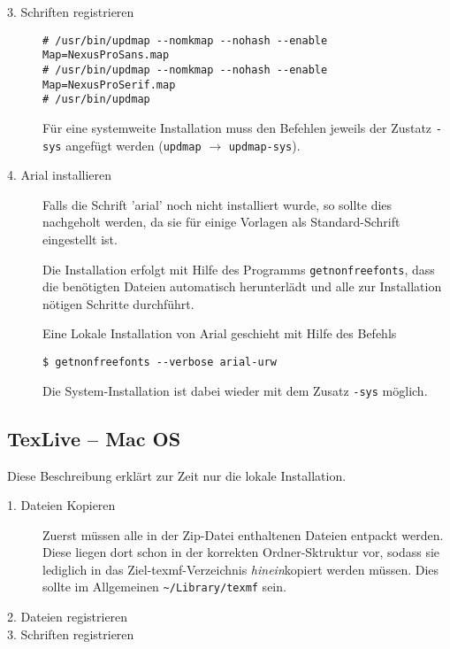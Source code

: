 \begin{description}
  \item[3. Schriften registrieren]\hfill

    \begin{lstlisting}
# /usr/bin/updmap --nomkmap --nohash --enable Map=NexusProSans.map
# /usr/bin/updmap --nomkmap --nohash --enable Map=NexusProSerif.map
# /usr/bin/updmap
    \end{lstlisting}
    
    Für eine systemweite Installation muss den Befehlen jeweils der Zustatz
    \texttt{-sys} angefügt werden (\lstinline{updmap} $\to$ \lstinline{updmap-sys}).
  
  \item[4. Arial installieren]\hfill
    Falls die Schrift 'arial' noch nicht installiert wurde, so sollte dies
    nachgeholt werden, da sie für einige Vorlagen als Standard-Schrift
    eingestellt ist.
    
    Die Installation erfolgt mit Hilfe des Programms \lstinline{getnonfreefonts},
    dass die benötigten Dateien automatisch herunterlädt und alle zur Installation
    nötigen Schritte durchführt.
    
    Eine Lokale Installation von Arial geschieht mit Hilfe des Befehls
    \begin{lstlisting}
$ getnonfreefonts --verbose arial-urw
    \end{lstlisting}
    
    Die System-Installation ist dabei wieder mit dem Zusatz \lstinline{-sys}
    möglich.



\end{description}


\newenvironment{knownissue}[1]{%
  \paragraph{#1}\hfill
  \newcommand{\solution}[1]{\noindent{\itshape ##1}}
}{%
}

\subsection{TexLive -- Mac OS}

Diese Beschreibung erklärt zur Zeit nur die lokale Installation.

\begin{description}
  \item[1. Dateien Kopieren] Zuerst müssen alle in der Zip-Datei enthaltenen
    Dateien entpackt werden.
    Diese liegen dort schon in der korrekten Ordner-Sktruktur vor, sodass
    sie lediglich in das Ziel-texmf-Verzeichnis \emph{hinein}kopiert werden
    müssen.
    Dies sollte im Allgemeinen \lstinline{~/Library/texmf} sein.
  \item[2. Dateien registrieren]
  \item[3. Schriften registrieren]
    
\end{description}

